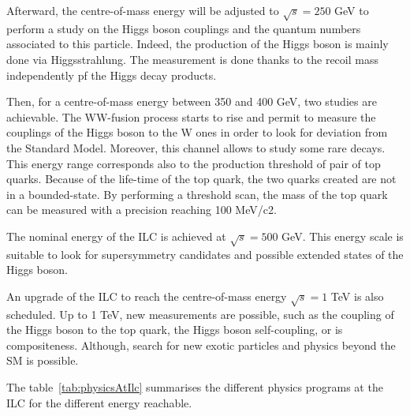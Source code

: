    Afterward, the centre-of-mass energy will be adjusted to $\sqrt{s} = 250$ GeV to perform a study on the Higgs boson couplings and the quantum numbers associated to this particle. 
   Indeed, the production of the Higgs boson is mainly done via Higgsstrahlung. 
   The measurement is done thanks to the recoil mass independently pf the Higgs decay products.
 
   Then, for a centre-of-mass energy between 350 and 400 GeV, two studies are achievable. 
   The WW-fusion process starts to rise and permit to measure the couplings of the Higgs boson to the W ones in order to look for deviation from the Standard Model. 
   Moreover, this channel allows to study some rare decays. 
   This energy range corresponds also to the production threshold of pair of top quarks. 
   Because of the life-time of the top quark, the two quarks created are not in a bounded-state. 
   By performing a threshold scan, the mass of the top quark can be measured with a precision reaching 100 MeV/c2.

   The nominal energy of the \gls{ILC} is achieved at $\sqrt{s} = 500$ GeV.
   This energy scale is suitable to look for supersymmetry candidates and possible extended states of the Higgs boson.

   An upgrade of the ILC to reach the centre-of-mass energy $\sqrt{s} = 1$ TeV is also scheduled.
   Up to 1 TeV, new measurements are possible, such as the coupling of the Higgs boson to the top quark, the Higgs boson self-coupling, or is compositeness.
   Although, search for new exotic particles and physics beyond the \gls{SM} is possible.
    
   The table~\ref{tab:physicsAtIlc} summarises the different physics programs at the ILC for the different energy reachable.  

